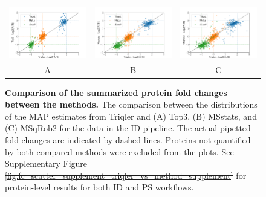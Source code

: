 \documentclass[10pt,letterpaper]{article}
\providecommand{\DIFadd}[1]{{\protect\color{blue}\uwave{#1}}} %
\providecommand{\DIFdel}[1]{{\protect\color{red}\sout{#1}}}                      %
\providecommand{\DIFaddFL}[1]{\DIFadd{#1}} %
\providecommand{\DIFdelFL}[1]{\DIFdel{#1}} %
\providecommand{\DIFaddbeginFL}{} %
\providecommand{\DIFaddendFL}{} %
\providecommand{\DIFdelbeginFL}{} %
\providecommand{\DIFdelendFL}{} %
\newcommand{\DIFscaledelfig}{0.5}
\newlength{\DIFdelgraphicswidth} %
\newlength{\DIFdelgraphicsheight} %
\newcommand{\DIFaddincludegraphics}[2][]{{\color{blue}\fbox{\DIFOincludegraphics[#1]{#2}}}} %
\newcommand{\DIFdelincludegraphics}[2][]{%
\sbox{\DIFdelgraphicsbox}{\DIFOincludegraphics[#1]{#2}}%
\settoboxwidth{\DIFdelgraphicswidth}{\DIFdelgraphicsbox} %
\settoboxtotalheight{\DIFdelgraphicsheight}{\DIFdelgraphicsbox} %
\scalebox{\DIFscaledelfig}{%
\parbox[b]{\DIFdelgraphicswidth}{\usebox{\DIFdelgraphicsbox}\\[-\baselineskip] \rule{\DIFdelgraphicswidth}{0em}}\llap{\resizebox{\DIFdelgraphicswidth}{\DIFdelgraphicsheight}{%
\setlength{\unitlength}{\DIFdelgraphicswidth}%
\begin{picture}(1,1)%
\thicklines\linethickness{2pt} %
{\color[rgb]{1,0,0}\put(0,0){\framebox(1,1){}}}%
{\color[rgb]{1,0,0}\put(0,0){\line( 1,1){1}}}%
{\color[rgb]{1,0,0}\put(0,1){\line(1,-1){1}}}%
\end{picture}%
}\hspace*{3pt}}} %
} %
\DeclareRobustCommand{\DIFaddbeginFL}{\DIFOaddbeginFL \let\includegraphics\DIFaddincludegraphics} %
\DeclareRobustCommand{\DIFaddendFL}{\DIFOaddendFL \let\includegraphics\DIFOincludegraphics} %
\DeclareRobustCommand{\DIFdelbeginFL}{\DIFOdelbeginFL \let\includegraphics\DIFdelincludegraphics} %
\DeclareRobustCommand{\DIFdelendFL}{\DIFOaddendFL \let\includegraphics\DIFOincludegraphics} %
\begin{document}
\begin{figure}[hbt]
    \centering
    \begin{tabular}{ccc}
        \DIFdelbeginFL %
\DIFdelendFL \DIFaddbeginFL \includegraphics[width=0.33\linewidth]{./img/scatter_ID_triqler_vs_top3.png} \DIFaddendFL & 
        \DIFdelbeginFL %
\DIFdelendFL \DIFaddbeginFL \includegraphics[width=0.33\linewidth]{./img/scatter_ID_triqler_vs_msstats.png} \DIFaddendFL & 
        \DIFdelbeginFL %
\DIFdelendFL \DIFaddbeginFL \includegraphics[width=0.33\linewidth]{./img/scatter_ID_triqler_vs_msqrob2.png} \DIFaddendFL \\
        A & B & C
    \end{tabular}
    \caption{{\bf Comparison of the summarized protein fold changes between the methods.} The comparison between the distributions of the MAP estimates from Triqler and (A) Top3, (B) MSstats, and (C) MSqRob2 for the data in the ID pipeline. The actual pipetted fold changes are indicated by dashed lines. Proteins not quantified by both compared methods were excluded from the plots. See Supplementary Figure \DIFdelbeginFL \DIFdelFL{\ref{fig:fc_scatter_supplement_triqler_vs_method_supplement} }\DIFdelendFL \DIFaddbeginFL \DIFaddFL{\ref{fig:fc_scatter_triqler_vs_method_supplement} }\DIFaddendFL for protein-level results for both ID and PS workflows. \label{fig:fc_scatter}}
\end{figure}
\end{document}
